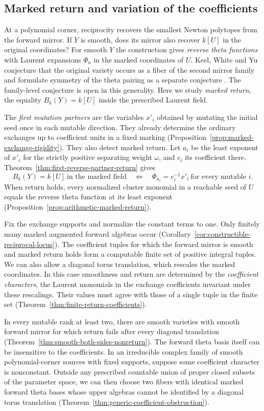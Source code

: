 \documentclass[11pt,reqno]{amsart}
\numberwithin{equation}{section}
\theoremstyle{definition}
\theoremstyle{remark}
\begin{document}
\subsection*{Marked return and variation of the coefficients}
At a polynomial corner, reciprocity recovers the smallest Newton
polytopes from the forward mirror. If \(Y\) is smooth, does its mirror
also recover \(k[U]\) in the original coordinates? For smooth \(Y\)
the construction gives \emph{reverse theta functions} with Laurent
expansions \(\Phi_a\) in the marked coordinates of \(U\).
Keel, White and Yu conjecture that the
original variety occurs as a fiber of the second mirror family and
formulate symmetry of the theta pairing as a separate conjecture
\cite[Conjectures~21.4 and~21.6]{KWY}. The family-level conjecture is
open in this generality. Here we study \emph{marked return}, the
equality \(B_k(Y)=k[U]\) inside the prescribed Laurent field.

The \emph{first mutation partners} are the variables \(x'_i\) obtained
by mutating the initial seed once in each mutable direction. They already
determine the ordinary exchanges up to coefficient units in a fixed
marking (Proposition~\ref{prop:marked-exchange-rigidity}). They also
detect marked return. Let \(a_i\) be the least exponent of \(x'_i\)
for the strictly positive separating weight \(\omega\), and \(c_i\)
its coefficient there. Theorem~\ref{thm:first-reverse-partner-return}
gives
\[ B_k(Y)=k[U]\ \text{in the marked field}\quad\Longleftrightarrow\quad \Phi_{a_i}=c_i^{-1}x'_i\ \text{for every mutable }i. \]
When return holds, every normalized cluster monomial in a reachable
seed of \(U\) equals the reverse theta function at its least exponent
(Proposition~\ref{prop:arithmetic-marked-return}).

Fix the exchange supports and normalize the constant terms to one.
Only finitely many marked augmented forward algebras occur
(Corollary~\ref{cor:constructible-reciprocal-locus}). The coefficient
tuples for which the forward mirror is smooth and marked return holds
form a computable finite set of positive integral tuples. We can also
allow a diagonal torus translation, which rescales the marked coordinates.
In this case smoothness and return are determined by the
\emph{coefficient characters}, the Laurent monomials in the exchange
coefficients invariant under these rescalings. Their values must agree
with those of a single tuple in the finite set
(Theorem~\ref{thm:finite-return-coefficients}).

In every mutable rank at least two, there are smooth varieties with
smooth forward mirror for which return fails after every diagonal
translation (Theorem~\ref{thm:smooth-both-sides-nonreturn}). The
forward theta basis itself can be insensitive to the coefficients.
In an irreducible complex family of smooth polynomial-corner sources
with fixed supports, suppose some coefficient character is nonconstant.
Outside any prescribed countable union of proper closed subsets of the
parameter space, we can then choose two fibers with identical marked
forward theta bases whose upper algebras cannot be identified by a
diagonal torus translation (Theorem~\ref{thm:generic-coefficient-obstruction}).
\end{document}
